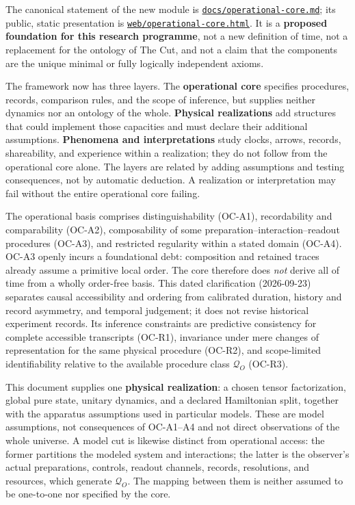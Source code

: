 \documentclass[11pt]{article}
\theoremstyle{definition}
\theoremstyle{remark}
\begin{document}
The canonical statement of the new module is \href{../docs/operational-core.md}{\texttt{docs/operational-core.md}}; its public, static presentation is \href{../web/operational-core.html}{\texttt{web/operational-core.html}}. It is a \textbf{proposed foundation for this research programme}, not a new definition of time, not a replacement for the ontology of The Cut, and not a claim that the components are the unique minimal or fully logically independent axioms.

The framework now has three layers. The \textbf{operational core} specifies procedures, records, comparison rules, and the scope of inference, but supplies neither dynamics nor an ontology of the whole. \textbf{Physical realizations} add structures that could implement those capacities and must declare their additional assumptions. \textbf{Phenomena and interpretations} study clocks, arrows, records, shareability, and experience within a realization; they do not follow from the operational core alone. The layers are related by adding assumptions and testing consequences, not by automatic deduction. A realization or interpretation may fail without the entire operational core failing.

The operational basis comprises distinguishability (OC-A1), recordability and comparability (OC-A2), composability of some preparation--interaction--readout procedures (OC-A3), and restricted regularity within a stated domain (OC-A4). OC-A3 openly incurs a foundational debt: composition and retained traces already assume a primitive local order. The core therefore does \emph{not} derive all of time from a wholly order-free basis. This dated clarification (2026-09-23) separates causal accessibility and ordering from calibrated duration, history and record asymmetry, and temporal judgement; it does not revise historical experiment records. Its inference constraints are predictive consistency for complete accessible transcripts (OC-R1), invariance under mere changes of representation for the same physical procedure (OC-R2), and scope-limited identifiability relative to the available procedure class $\mathcal Q_O$ (OC-R3).

This document supplies one \textbf{physical realization}: a chosen tensor factorization, global pure state, unitary dynamics, and a declared Hamiltonian split, together with the apparatus assumptions used in particular models. These are model assumptions, not consequences of OC-A1--A4 and not direct observations of the whole universe. A model cut is likewise distinct from operational access: the former partitions the modeled system and interactions; the latter is the observer's actual preparations, controls, readout channels, records, resolutions, and resources, which generate $\mathcal Q_O$. The mapping between them is neither assumed to be one-to-one nor specified by the core.
\end{document}
